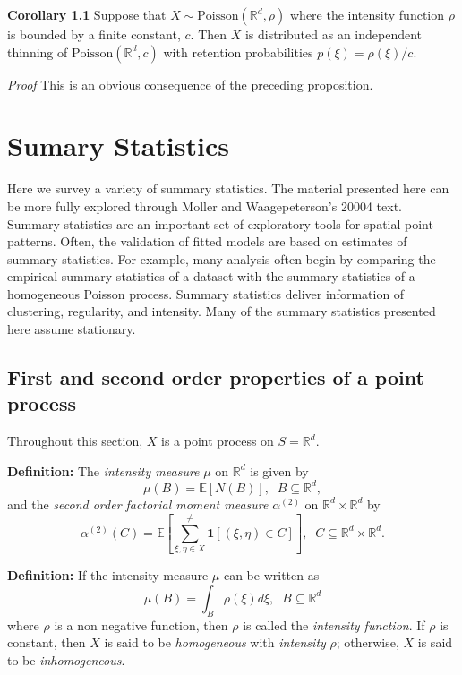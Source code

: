 \documentclass[12pt,twoside]{reedthesis}
\begin{document}
  \textbf{Corollary 1.1} Suppose that
  \(X\sim \text{Poisson}(\mathbb{R}^d, \rho)\) where the intensity
  function \(\rho\) is bounded by a finite constant, \(c\). Then \(X\) is
  distributed as an independent thinning of
  \(\text{Poisson}(\mathbb{R}^d, c)\) with retention probabilities
  \(p(\xi) = \rho(\xi)/c\).
  
  \emph{Proof} This is an obvious consequence of the preceding
  proposition.
  
  \section{Sumary Statistics}\label{sumary-statistics}
  
  Here we survey a variety of summary statistics. The material presented
  here can be more fully explored through Moller and Waagepeterson's 20004
  text. Summary statistics are an important set of exploratory tools for
  spatial point patterns. Often, the validation of fitted models are based
  on estimates of summary statistics. For example, many analysis often
  begin by comparing the empirical summary statistics of a dataset with
  the summary statistics of a homogeneous Poisson process. Summary
  statistics deliver information of clustering, regularity, and intensity.
  Many of the summary statistics presented here assume stationary.
  
  \subsection{First and second order properties of a point
  process}\label{first-and-second-order-properties-of-a-point-process}
  
  Throughout this section, \(X\) is a point process on
  \(S = \mathbb{R}^d\).
  
  \textbf{Definition:} The \emph{intensity measure} \(\mu\) on
  \(\mathbb{R}^d\) is given by
  \[ \mu(B) = \mathbb{E}[N(B)], \; \; B\subseteq \mathbb{R}^d, \] and the
  \emph{second order factorial moment measure} \(\alpha^{(2)}\) on
  \(\mathbb{R}^d \times \mathbb{R}^d\) by
  \[ \alpha^{(2)}(C) = \mathbb{E} [\sum_{\xi, \eta \in X}^{\neq} \mathbf{1} [(\xi, \eta) \in C]], \; \; C\subseteq \mathbb{R}^d \times \mathbb{R}^d. \]
  
  \textbf{Definition:} If the intensity measure \(\mu\) can be written as
  \[ \mu(B) = \int_B \rho(\xi) d\xi, \; \; B\subseteq \mathbb{R}^d \]
  where \(\rho\) is a non negative function, then \(\rho\) is called the
  \emph{intensity function}. If \(\rho\) is constant, then \(X\) is said
  to be \emph{homogeneous} with \emph{intensity} \(\rho\); otherwise,
  \(X\) is said to be \emph{inhomogeneous}.
  
\end{document}
